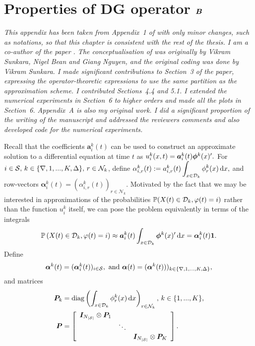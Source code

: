 \chapter{Properties of DG operator \(  \boldsymbol B\)}\label{appendix:properties}
\begin{center}
    \begin{minipage}{0.8\textwidth}
        \textit{This appendix has been taken from Appendix~1 of \cite{blnos2022} with only minor changes, such as notations, so that this chapter is consistent with the rest of the thesis. I am a co-author of the paper \cite{blnos2022}. The conceptualisation of \cite{blnos2022} was originally by Vikram Sunkara, Nigel Bean and Giang Nguyen, and the original coding was done by Vikram Sunkara. I made significant contributions to Section~3 of the paper, expressing the operator-theoretic expressions to use the same partition as the approximation scheme. I contributed Sections~4.4 and 5.1. I extended the numerical experiments in Section~6 to higher orders and made all the plots in Section~6. Appendix~A is also my original work. I did a significant proportion of the writing of the manuscript and addressed the reviewers comments and also developed code for the numerical experiments.
        }
    \end{minipage}
    \end{center}
Recall that the coefficients \({\boldsymbol a}_i^k(t)\) can be used to construct an approximate solution to a differential equation at time \(t\) as \(u_i^k(x,t)={\boldsymbol a}_i^k(t)\boldsymbol \phi^k(x)'{}.\) For \(i\in\mathcal{S},\,k\in\{\nabla,1,...,K,\Delta\},\,r\in\mathcal N_k\), define \(\alpha_{i,r}^k(t) := a_{i,r}^k(t)\displaystyle\int_{x\in\mathcal{D}_k}\phi_r^k(x)\, \mathrm{d} x,\) and row-vectors \(\boldsymbol \alpha_i^k(t)=(\alpha_{i,r}^k(t))_{r\in\mathcal N_k}\). Motivated by the fact that we may be interested in approximations of the probabilities \(\mathbb P(X(t)\in\mathcal{D}_k,\varphi(t)=i)\) rather than the function \(u_i^k\) itself, we can pose the problem equivalently in terms of the integrals 
\[\mathbb P\left(X(t)\in\mathcal{D}_k,\varphi(t)=i\right)\approx{\boldsymbol a}_i^k(t)\int_{x\in\mathcal{D}_k}\boldsymbol \phi^k(x)'{}\, \mathrm{d} x={\boldsymbol \alpha}_i^k(t)\boldsymbol 1.\] 
Define
\[\boldsymbol \alpha^k(t) = (\boldsymbol \alpha_i^k(t))_{i\in\mathcal{S}},\mbox{ and } \boldsymbol \alpha(t)=(\boldsymbol \alpha^k(t)))_{k\in\{\nabla,1,...,K,\Delta\}},\]
and matrices 
\begin{align*}
\boldsymbol P_k &= \mathrm{diag}\left(\int_{x\in\mathcal{D}_k}\phi_r^k(x)\, \mathrm{d} x\right)_{ r\in\mathcal N_k},\, k\in\{1,...,K\},
\\\boldsymbol P &=\left[\begin{array}{ccc}
		\boldsymbol I_{N_{|\mathcal{S}|}}\otimes \boldsymbol P_1 & &\\
		& \ddots &\\
		& & \boldsymbol I_{N_{|\mathcal{S}|}}\otimes \boldsymbol P_K
	\end{array}\right].
\end{align*}
